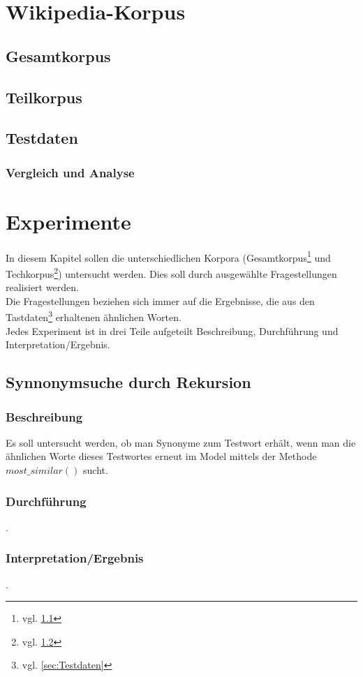 \documentclass[12pt,a4paper]{report}
\begin{document}
\chapter{Wikipedia-Korpus}
	\section{Gesamtkorpus}
	\label{sec:Gesamtkorpus}
	\section{Teilkorpus}
	\label{sec:Teilkorpus}	
	\section{Testdaten}
	\subsection{Vergleich und Analyse}
\newpage
\chapter{Experimente}
In diesem Kapitel sollen die unterschiedlichen Korpora (Gesamtkorpus\footnote{vgl. \ref{sec:Gesamtkorpus}} und Techkorpus\footnote{vgl. \ref{sec:Teilkorpus}}) untersucht werden. Dies soll durch ausgewählte Fragestellungen realisiert werden.
\\Die Fragestellungen beziehen sich immer auf die Ergebnisse, die aus den Tastdaten\footnote{vgl. \ref{sec:Testdaten}} erhaltenen ähnlichen Worten.
\\Jedes Experiment ist in drei Teile aufgeteilt Beschreibung, Durchführung und Interpretation/Ergebnis.
	\section{Synnonymsuche durch Rekursion}
		\subsection{Beschreibung}
		Es soll untersucht werden, ob man Synonyme zum Testwort erhält, wenn man die ähnlichen Worte dieses Testwortes erneut im Model mittels der Methode $most\_similar()$ sucht. 
		\subsection{Durchführung}
		.
		\subsection{Interpretation/Ergebnis}
		.
	\newpage
\end{document}
